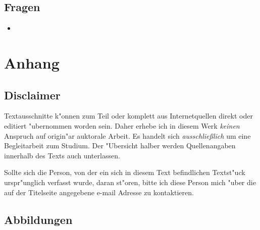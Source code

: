 \documentclass[emulatestandardclasses]{scrartcl}
\begin{document}
\subsection{Fragen}

\begin{itemize}
  \item 
\end{itemize}


\newpage
\section{Anhang}

\subsection{Disclaimer}

Textausschnitte k"onnen zum Teil oder komplett aus Internetquellen direkt oder editiert "ubernommen worden sein. Daher erhebe ich in diesem Werk \emph{keinen} Anspruch auf origin"ar auktorale Arbeit. Es handelt sich \emph{ausschlie\ss lich} um eine Begleitarbeit zum Studium. Der "Ubersicht halber werden Quellenangaben innerhalb des Texts auch unterlassen. 

Sollte sich die Person, von der ein sich in diesem Text befindlichen Textst"uck urspr"unglich verfasst wurde, daran st"oren, bitte ich diese Person mich "uber die auf der Titelseite angegebene e-mail Adresse zu kontaktieren.
\subsection{Abbildungen}
\end{document}
